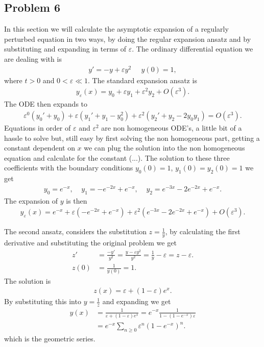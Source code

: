 \documentclass[a4paper]{article}
\newcommand{\eps}{\varepsilon}
\begin{document}
\subsection{Problem 6}
In this section we will calculate the asymptotic expansion of a regularly
perturbed equation in two ways, by doing the regular expansion ansatz and by
substituting and expanding in terms of $\eps$. The ordinary differential
equation we are dealing with is
\begin{align}
    y' = -y + \eps y^2 \;\;\;\;\; y(0) = 1,
\end{align}
where $t > 0$ and $0 < \eps \ll 1$. The standard expansion ansatz is
\begin{align}
y_\eps(x) = y_0 + \eps y_1 + \eps^2 y_2 + O(\eps^3).
\end{align}
The ODE then expands to
\begin{align}
    \eps^0(y_0' + y_0) + \eps(y_1' + y_1 - y_0^2) + \eps^2(y_2' + y_2 -
    2y_0y_1) = O(\eps^3).
\end{align}
Equations in order of $\eps$ and $\eps^2$ are non homogeneous ODE's, a little
bit of a hassle to solve but, still easy by first solving the non homogeneous
part, getting a constant dependent on $x$ we can plug the solution into the
non homogeneous equation and calculate for the constant (...). The solution to
these three coefficients with the boundary conditions $y_0(0) = 1$, $y_1(0) =
y_2(0) = 1$ we get
\begin{align}
    y_0 = e^{-x}, \;\;\;\; y_1 = -e^{-2x} + e^{-x}, \;\;\;\; y_2 = e^{-3x} -
    2e^{-2x} + e^{-x}.
\end{align}
The expansion of $y$ is then
\begin{align}
    y_\eps (x) = e^{-x} + \eps(-e^{-2x} + e^{-x}) + \eps^2(e^{-3x} - 2e^{-2x}
+ e^{-x}) + O(\eps^3).  \end{align}

The second ansatz, considers the substitution $z = \frac{1}{y}$, by
calculating the first derivative and substituting the original problem we
get
\begin{align}
    z' &= \frac{-y'}{y^2} = \frac{y-\eps y^2}{y^2} = \frac{1}{y} - \eps = z -
    \eps. \\
    z(0) &= \frac{1}{y(0)} = 1.
\end{align}
The solution is
\begin{align}
    z(x) = \eps + (1-\eps) e^x.
\end{align}
By substituting this into $y = \frac{1}{z}$ and expanding we get
\begin{align}
    y(x) &= \frac{1}{\eps+(1-\eps)e^x} = e^{-x} \frac{1}{1 - (1- e^{-x})\eps}
    \\
         &= e^{-x} \sum_{n\geq 0} \eps^n(1-e^{-x})^n.
\end{align}
which is the geometric series.
\end{document}
